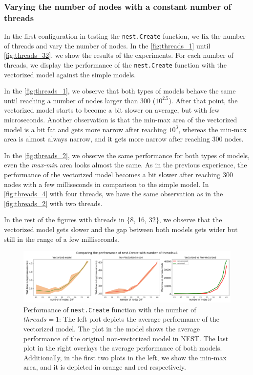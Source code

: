 \subsubsection*{Varying the number of nodes with a constant number of threads}

 In the first configuration in testing the \texttt{nest.Create} function, we fix the number of threads and vary the number of nodes. In the  \autoref{fig:threads_1} until \autoref{fig:threads_32}, we show the results of the experiments. For each number of threads, we display the performance of the \texttt{nest.Create} function with the vectorized model against the simple models. 


In the \autoref{fig:threads_1}, we observe that both types of models behave the same until reaching a number of nodes larger than 300 ($10^{2.5}$). After that point, the vectorized model starts to become a bit slower on average, but with few microseconds. Another observation is that the min-max area of the vectorized model is a bit fat and gets more narrow after reaching $10^3$, whereas the min-max area is almost always narrow, and it gets more narrow after reaching 300 nodes.

In the \autoref{fig:threads_2}, we observe the same performance for both types of models, even the \emph{max-min} area looks almost the same. As in the previous experience, the performance of the vectorized model becomes a bit slower after reaching 300 nodes with a few milliseconds in comparison to the simple model. In  \autoref{fig:threads_4} with four threads, we have the same observation as in the  \autoref{fig:threads_2} with two threads.

In the rest of the figures with threads in \{8, 16, 32\}, we observe that the vectorized model gets slower and the gap between both models gets wider but still in the range of a few milliseconds.

\begin{figure}[ht!]
    \centering
    \includegraphics[width=\textwidth]{src/pic/thread_1.png}
    \caption{Performance of \texttt{nest.Create} function with the number of $threads=1$: The left plot depicts the average performance of the vectorized model. The plot in the model shows the average performance of the original non-vectorized model in NEST. The last plot in the right overlays the average performance of both models. Additionally, in the first two plots in the left, we show the min-max area, and it is depicted in orange and red respectively.}
    \label{fig:threads_1}
\end{figure}

